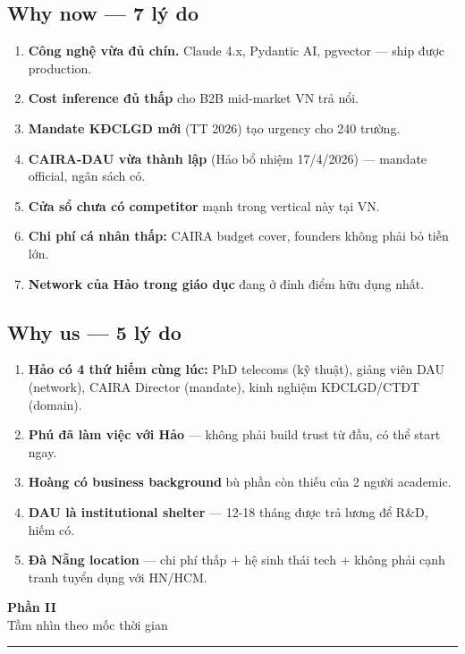 \documentclass[11pt,a4paper]{article}
\begin{document}
\subsection{Why now --- 7 lý do}

\begin{enumerate}
\item \textbf{Công nghệ vừa đủ chín.} Claude 4.x, Pydantic AI, pgvector --- ship được production.
\item \textbf{Cost inference đủ thấp} cho B2B mid-market VN trả nổi.
\item \textbf{Mandate KĐCLGD mới} (TT 2026) tạo urgency cho 240 trường.
\item \textbf{CAIRA-DAU vừa thành lập} (Hảo bổ nhiệm 17/4/2026) --- mandate official, ngân sách có.
\item \textbf{Cửa sổ chưa có competitor} mạnh trong vertical này tại VN.
\item \textbf{Chi phí cá nhân thấp:} CAIRA budget cover, founders không phải bỏ tiền lớn.
\item \textbf{Network của Hảo trong giáo dục} đang ở đỉnh điểm hữu dụng nhất.
\end{enumerate}

\subsection{Why us --- 5 lý do}

\begin{enumerate}
\item \textbf{Hảo có 4 thứ hiếm cùng lúc:} PhD telecoms (kỹ thuật), giảng viên DAU (network), CAIRA Director (mandate), kinh nghiệm KĐCLGD/CTĐT (domain).
\item \textbf{Phú đã làm việc với Hảo} --- không phải build trust từ đầu, có thể start ngay.
\item \textbf{Hoàng có business background} bù phần còn thiếu của 2 người academic.
\item \textbf{DAU là institutional shelter} --- 12-18 tháng được trả lương để R\&D, hiếm có.
\item \textbf{Đà Nẵng location} --- chi phí thấp + hệ sinh thái tech + không phải cạnh tranh tuyển dụng với HN/HCM.
\end{enumerate}

\clearpage

\begin{center}
\vspace*{0.5em}
{\sffamily\bfseries\Huge\color{vision} Phần II}\\[0.5em]
{\sffamily\LARGE\color{mid} Tầm nhìn theo mốc thời gian}\\[0.5em]
{\color{vision}\rule{6cm}{0.4pt}}
\end{center}
\vspace{1em}
\end{document}

